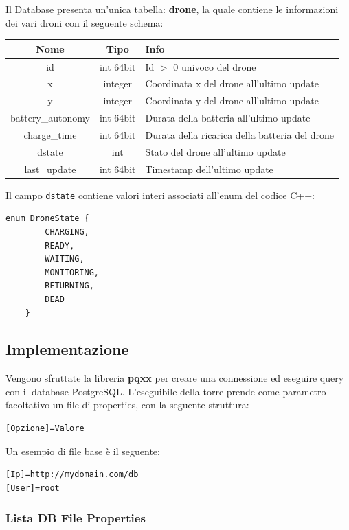 \documentclass[a4paper, 11pt]{article}
\begin{document}
Il Database presenta un'unica tabella: \textbf{drone}, la quale contiene le informazioni dei vari droni con il seguente schema:

\begin{longtable}{|c|c|p{}|}
\hline
\textbf{Nome} & \textbf{Tipo} & \textbf{Info} \\
\hline
id & int 64bit & Id $>$ 0 univoco del drone \\
\hline
x & integer & Coordinata x del drone all'ultimo update \\
\hline
y & integer & Coordinata y del drone all'ultimo update \\
\hline
battery\_autonomy & int 64bit & Durata della batteria all'ultimo update \\
\hline
charge\_time & int 64bit & Durata della ricarica della batteria del drone \\
\hline
dstate & int & Stato del drone all'ultimo update \\
\hline
last\_update & int 64bit & Timestamp dell'ultimo update \\
\hline
\end{longtable}

Il campo \texttt{dstate} contiene valori interi associati all'enum del codice C++:

\begin{lstlisting}[style=customcpp]
    enum DroneState {
        CHARGING,
        READY,
        WAITING,
        MONITORING,
        RETURNING,
        DEAD
    }
\end{lstlisting}

\subsection{Implementazione}

Vengono sfruttate la libreria \textbf{pqxx} per creare una connessione ed eseguire query con il database PostgreSQL.
L'eseguibile della torre prende come parametro facoltativo un file di properties, con la seguente struttura:
\begin{verbatim}
[Opzione]=Valore
\end{verbatim}
Un esempio di file base è il seguente:
\begin{verbatim}
[Ip]=http://mydomain.com/db
[User]=root
\end{verbatim}

\subsubsection{Lista DB File Properties}
\end{document}
